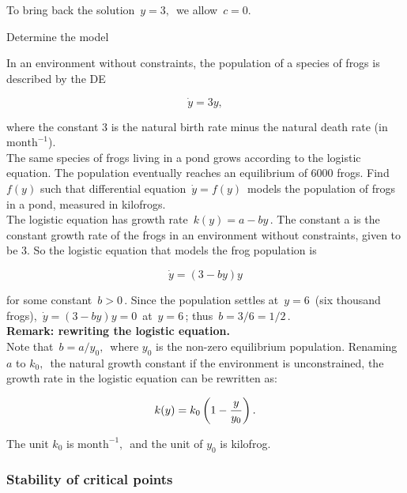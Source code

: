 To bring back the solution $\,y=3,\,$ we allow $\,c=0.$

\begin{exercise}
  Determine the model
\end{exercise}

In an environment without constraints, the population of a species of frogs is described by the DE

\begin{equation*}
  \dot y = 3y, 
\end{equation*}

where the constant $3$ is the natural birth rate minus the natural death rate
(in $\text{month}^{-1}$). \\

The same species of frogs living in a pond grows according to the logistic equation.
The population eventually reaches an equilibrium of 6000 frogs.
Find $f(y)$ such that differential equation $\, \dot y = f(y) \,$ models the population of frogs in a pond, measured in kilofrogs.\\

The logistic equation has growth rate $\, k(y)=a−by\,$.
The constant a is the constant growth rate of the frogs in an environment without constraints,
given to be $3$. So the logistic equation that models the frog population is

\begin{equation*}
  \dot y = (3−by)y
\end{equation*}

for some constant $\, b>0\,$.
Since the population settles at $\,y=6\,$ (six thousand frogs),
$\, \dot y = (3−by)y=0 \,$ at $\,y=6\,$; thus $\,b=3/6=1/2\,$.\\
\textbf{Remark: rewriting the logistic equation. } \\
Note that $\, b=a/y_0,\,$ where $y_0$ is the non-zero equilibrium population.
Renaming $a$ to $k_0,\,$ the natural growth constant if the environment is unconstrained,
the growth rate in the logistic equation can be rewritten as:

\begin{equation*}
  \displaystyle  \displaystyle k(y)=k_0\left(1-\frac{y}{y_0}\right).
\end{equation*}

The unit $k_0$ is $\text{month}^{-1},\,$ and the unit of $y_0$ is kilofrog. 

\clearpage

\subsubsection{Stability of critical points}

